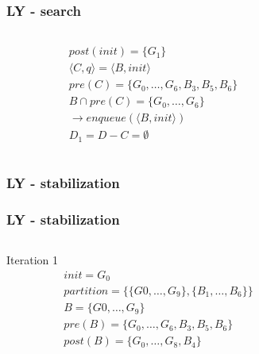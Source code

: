 \documentclass[11pt,handout]{beamer}
\begin{document}
\begin{frame}[fragile]
  \frametitle{LY - search}
  \begin{columns}
    \begin{column}{0.5\textwidth}
      \begin{align*}
        & post(init) = \{G_1\} \\
        & \langle {C,q} \rangle = \langle {B,init} \rangle \\
        & pre(C) = \{ G_0,\dots,G_6,B_3,B_5,B_6 \} \\
        & B \cap pre(C) =  \{G_0,\dots,G_6\} \\
        & \to enqueue(\langle {B,init} \rangle) \\
        & D_1 = D - C = \emptyset
      \end{align*}
    \end{column}
    \begin{column}{0.5\textwidth}%
      
    \end{column}
  \end{columns}
\end{frame}

\begin{frame}[fragile]
  \frametitle{LY - stabilization}
  \begin{algorithmic}[1]
    \EndIf
    \EndWhile
  \end{algorithmic}
\end{frame}

\begin{frame}[fragile]
  \frametitle{LY - stabilization}
  \begin{columns}
    \begin{column}{0.5\textwidth}
      Iteration 1
      \begin{align*}
        & init = G_0 \\
        & partition = \{ \{G0,\dots,G_9\},\{B_1,\dots,B_6\} \} \\
        & B = \{G0,\dots,G_9\} \\
        & pre(B) = \{ G_0,\dots,G_6,B_3,B_5,B_6\}\\
        & post(B) = \{G_0,\dots,G_8,B_4\}
      \end{align*}
    \end{column}
    \begin{column}{0.5\textwidth}%
      
    \end{column}
  \end{columns}
\end{frame}
\end{document}
